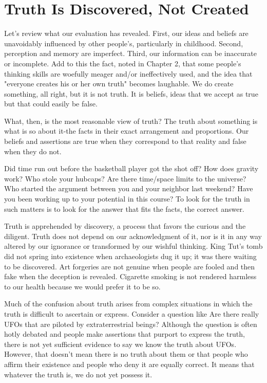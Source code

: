 \documentclass{book}
\begin{document}
\section{Truth Is Discovered, Not Created}

Let’s review what our evaluation has revealed. First, our ideas and beliefs are unavoidably influenced by other people’s, particularly in childhood.  Second, perception and memory are imperfect. Third, our information can be inaccurate or incomplete. Add to this the fact, noted in Chapter 2, that some people’s thinking skills are woefully meager and/or ineffectively used, and the idea that "everyone creates his or her own truth" becomes laughable. We do create something, all right, but it is not truth. It is beliefs, ideas that we accept as true but that could easily be false.

What, then, is the most reasonable view of truth? The truth about something is what is so about it-the facts in their exact arrangement and proportions. Our beliefs and assertions are true when they correspond to that reality and false when they do not.

Did time run out before the basketball player got the shot off? How does gravity work? Who stole your hubcaps? Are there time/space limits to the universe? Who started the argument between you and your neighbor last weekend? Have you been working up to your potential in this course? To look for the truth in such matters is to look for the answer that fits the facts, the correct answer.

Truth is apprehended by discovery, a process that favors the curious and the diligent. Truth does not depend on our acknowledgment of it, nor is it in any way altered by our ignorance or transformed by our wishful thinking. King Tut’s tomb did not spring into existence when archaeologists dug it up; it was there waiting to be discovered. Art forgeries are not genuine when people are fooled and then fake when the deception is revealed. Cigarette smoking is not rendered harmless to our health because we would prefer it to be so.

Much of the confusion about truth arises from complex situations in which the truth is difficult to ascertain or express. Consider a question like Are there really UFOs that are piloted by extraterrestrial beings? Although the question is often hotly debated and people make assertions that purport to express the truth, there is not yet sufficient evidence to say we know the truth about UFOs. However, that doesn’t mean there is no truth about them or that people who affirm their existence and people who deny it are equally correct. It means that whatever the truth is, we do not yet possess it.
\end{document}
